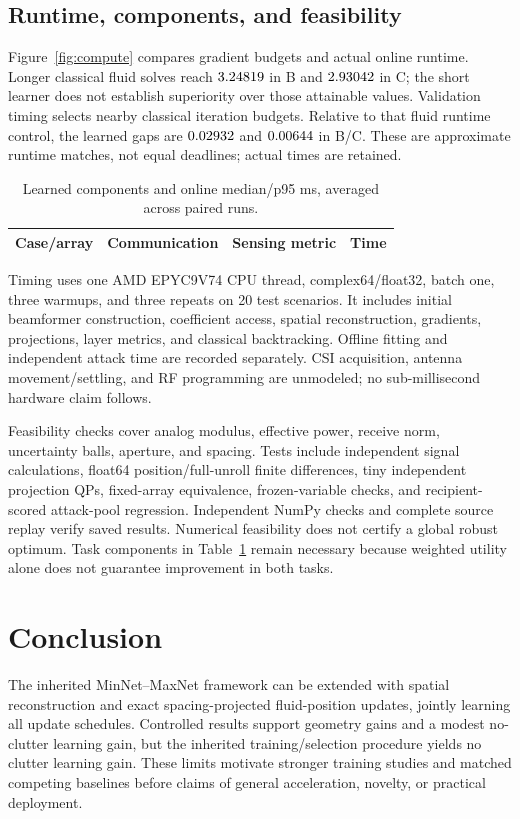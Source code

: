 \documentclass[10pt,journal,onecolumn,draftclsnofoot]{IEEEtran}
\begin{document}
\subsection{Runtime, components, and feasibility}
Figure~\ref{fig:compute} compares gradient budgets and actual online runtime. Longer classical fluid solves reach $3.24819$ in B and $2.93042$ in C; the short learner does not establish superiority over those attainable values. Validation timing selects nearby classical iteration budgets. Relative to that fluid runtime control, the learned gaps are $0.02932$ and $0.00644$ in B/C. These are approximate runtime matches, not equal deadlines; actual times are retained.

\begin{table}[t]\centering\footnotesize
\caption{Learned components and online median/p95 ms, averaged across paired runs.}\label{tab:components}
\begin{tabular}{cccc}\toprule
Case/array & Communication & Sensing metric & Time\\\midrule

\end{tabular}
\end{table}

Timing uses one AMD EPYC9V74 CPU thread, complex64/float32, batch one, three warmups, and three repeats on 20 test scenarios. It includes initial beamformer construction, coefficient access, spatial reconstruction, gradients, projections, layer metrics, and classical backtracking. Offline fitting and independent attack time are recorded separately. CSI acquisition, antenna movement/settling, and RF programming are unmodeled; no sub-millisecond hardware claim follows.

Feasibility checks cover analog modulus, effective power, receive norm, uncertainty balls, aperture, and spacing. Tests include independent signal calculations, float64 position/full-unroll finite differences, tiny independent projection QPs, fixed-array equivalence, frozen-variable checks, and recipient-scored attack-pool regression. Independent NumPy checks and complete source replay verify saved results. Numerical feasibility does not certify a global robust optimum. Task components in Table~\ref{tab:components} remain necessary because weighted utility alone does not guarantee improvement in both tasks.


\section{Conclusion}
The inherited MinNet--MaxNet framework can be extended with spatial reconstruction and exact spacing-projected fluid-position updates, jointly learning all update schedules. Controlled results support geometry gains and a modest no-clutter learning gain, but the inherited training/selection procedure yields no clutter learning gain. These limits motivate stronger training studies and matched competing baselines before claims of general acceleration, novelty, or practical deployment.
\end{document}
